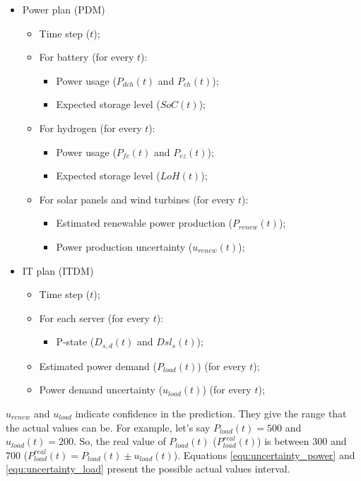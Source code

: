 \begin{itemize}
    \item Power plan (PDM)
    \begin{itemize}
        \item Time step ($t$);
        \item For battery (for every $t$):
        \begin{itemize}
            \item Power usage ($P_{dch}(t)$ and $P_{ch}(t)$);
            \item Expected storage level ($SoC(t)$);
        \end{itemize}
        \item For hydrogen (for every $t$):
        \begin{itemize}
            \item Power usage ($P_{fc}(t)$ and $P_{ez}(t)$);
            \item Expected storage level ($LoH(t)$);
        \end{itemize}
        \item For solar panels and wind turbines (for every $t$):
        \begin{itemize}
            \item Estimated renewable power production ($P_{renew}(t)$);
            \item Power production uncertainty ($u_{renew}(t)$);
        \end{itemize}
    \end{itemize}
    \item IT plan (ITDM)
    \begin{itemize}
        \item Time step ($t$);
        \item For each server (for every $t$):
        \begin{itemize}
            \item P-state ($D_{s,d}(t)$ and $Dsl_{s}(t)$);
        \end{itemize}
        \item Estimated power demand ($P_{load}(t)$) (for every $t$);
        \item Power demand uncertainty ($u_{load}(t)$) (for every $t$);
    \end{itemize}
\end{itemize}

$u_{renew}$ and $u_{load}$ indicate confidence in the prediction. They give the range that the actual values can be. For example, let's say $P_{load}(t) = 500$ and $u_{load}(t) = 200$. So, the real value of $P_{load}(t)$ ($P^{real}_{load}(t)$) is between 300 and 700 ($P^{real}_{load}(t) = P_{load}(t) \pm u_{load}(t)$). Equations \ref{equ:uncertainty_power} and \ref{equ:uncertainty_load} present the possible actual values interval.

